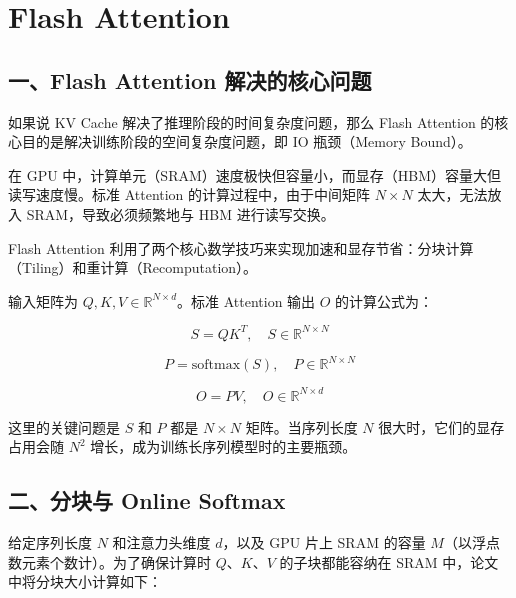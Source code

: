 \setcounter{section}{1}

\hypertarget{flash-attention}{%
\section{Flash Attention}\label{flash-attention}}

\hypertarget{ux4e00flash-attention-ux89e3ux51b3ux7684ux6838ux5fc3ux95eeux9898}{%
\subsection{一、Flash Attention 解决的核心问题}\label{ux4e00flash-attention-ux89e3ux51b3ux7684ux6838ux5fc3ux95eeux9898}}

如果说 KV Cache 解决了推理阶段的时间复杂度问题，那么 Flash Attention 的核心目的是解决训练阶段的空间复杂度问题，即 IO 瓶颈（Memory Bound）。

在 GPU 中，计算单元（SRAM）速度极快但容量小，而显存（HBM）容量大但读写速度慢。标准 Attention 的计算过程中，由于中间矩阵 \(N \times N\) 太大，无法放入 SRAM，导致必须频繁地与 HBM 进行读写交换。

Flash Attention 利用了两个核心数学技巧来实现加速和显存节省：分块计算（Tiling）和重计算（Recomputation）。

输入矩阵为 \(Q,K,V \in \mathbb{R}^{N \times d}\)。标准 Attention 输出 \(O\) 的计算公式为：

\[
S = QK^T,\quad S \in \mathbb{R}^{N \times N}
\]

\[
P = \mathrm{softmax}(S),\quad P \in \mathbb{R}^{N \times N}
\]

\[
O = PV,\quad O \in \mathbb{R}^{N \times d}
\]

这里的关键问题是 \(S\) 和 \(P\) 都是 \(N \times N\) 矩阵。当序列长度 \(N\) 很大时，它们的显存占用会随 \(N^2\) 增长，成为训练长序列模型时的主要瓶颈。

\hypertarget{ux4e8cux5206ux5757ux4e0e-online-softmax}{%
\subsection{二、分块与 Online Softmax}\label{ux4e8cux5206ux5757ux4e0e-online-softmax}}

给定序列长度 \(N\) 和注意力头维度 \(d\)，以及 GPU 片上 SRAM 的容量 \(M\)（以浮点数元素个数计）。为了确保计算时 \(Q\)、\(K\)、\(V\) 的子块都能容纳在 SRAM 中，论文中将分块大小计算如下：

